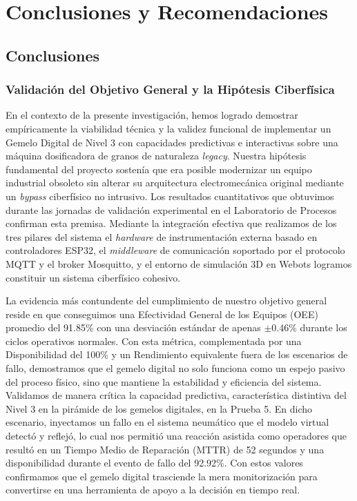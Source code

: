 \chapter{Conclusiones y Recomendaciones}
\label{chap:conclusiones}

\section{Conclusiones}

\subsection{Validación del Objetivo General y la Hipótesis Ciberfísica}

En el contexto de la presente investigación, hemos logrado demostrar empíricamente la viabilidad técnica y la validez funcional de implementar un Gemelo Digital de Nivel 3 con capacidades predictivas e interactivas sobre una máquina dosificadora de granos de naturaleza \textit{legacy}. Nuestra hipótesis fundamental del proyecto sostenía que era posible modernizar un equipo industrial obsoleto sin alterar su arquitectura electromecánica original mediante un \textit{bypass} ciberfísico no intrusivo. Los resultados cuantitativos que obtuvimos durante las jornadas de validación experimental en el Laboratorio de Procesos confirman esta premisa. Mediante la integración efectiva que realizamos de los tres pilares del sistema el \textit{hardware} de instrumentación externa basado en controladores ESP32, el \textit{middleware} de comunicación soportado por el protocolo MQTT y el broker Mosquitto, y el entorno de simulación 3D en Webots logramos constituir un sistema ciberfísico cohesivo.

La evidencia más contundente del cumplimiento de nuestro objetivo general reside en que conseguimos una Efectividad General de los Equipos (OEE) promedio del 91.85\% con una desviación estándar de apenas $\pm 0.46\%$ durante los ciclos operativos normales. Con esta métrica, complementada por una Disponibilidad del 100\% y un Rendimiento equivalente fuera de los escenarios de fallo, demostramos que el gemelo digital no solo funciona como un espejo pasivo del proceso físico, sino que mantiene la estabilidad y eficiencia del sistema. Validamos de manera crítica la capacidad predictiva, característica distintiva del Nivel 3 en la pirámide de los gemelos digitales, en la Prueba 5. En dicho escenario, inyectamos un fallo en el sistema neumático que el modelo virtual detectó y reflejó, lo cual nos permitió una reacción asistida como operadores que resultó en un Tiempo Medio de Reparación (MTTR) de 52 segundos y una disponibilidad durante el evento de fallo del 92.92\%. Con estos valores confirmamos que el gemelo digital trasciende la mera monitorización para convertirse en una herramienta de apoyo a la decisión en tiempo real.

